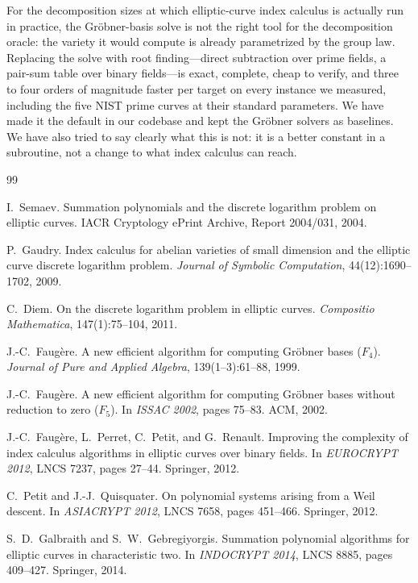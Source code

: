 \documentclass[10pt,a4paper]{article}
\theoremstyle{remark}
\begin{document}
For the decomposition sizes at which elliptic-curve index calculus is
actually run in practice, the Gr\"obner-basis solve is not the right
tool for the decomposition oracle: the variety it would compute is
already parametrized by the group law. Replacing the solve with root
finding---direct subtraction over prime fields, a pair-sum table over
binary fields---is exact, complete, cheap to verify, and three to four
orders of magnitude faster per target on every instance we measured,
including the five NIST prime curves at their standard parameters. We
have made it the default in our codebase and kept the Gr\"obner solvers
as baselines. We have also tried to say clearly what this is not: it is
a better constant in a subroutine, not a change to what index calculus
can reach.

\begin{thebibliography}{99}

I.~Semaev.
Summation polynomials and the discrete logarithm problem on elliptic curves.
IACR Cryptology ePrint Archive, Report 2004/031, 2004.

P.~Gaudry.
Index calculus for abelian varieties of small dimension and the elliptic curve discrete logarithm problem.
\emph{Journal of Symbolic Computation}, 44(12):1690--1702, 2009.

C.~Diem.
On the discrete logarithm problem in elliptic curves.
\emph{Compositio Mathematica}, 147(1):75--104, 2011.

J.-C.~Faug\`ere.
A new efficient algorithm for computing Gr\"obner bases ($F_4$).
\emph{Journal of Pure and Applied Algebra}, 139(1--3):61--88, 1999.

J.-C.~Faug\`ere.
A new efficient algorithm for computing Gr\"obner bases without reduction to zero ($F_5$).
In \emph{ISSAC 2002}, pages 75--83. ACM, 2002.

J.-C.~Faug\`ere, L.~Perret, C.~Petit, and G.~Renault.
Improving the complexity of index calculus algorithms in elliptic curves over binary fields.
In \emph{EUROCRYPT 2012}, LNCS 7237, pages 27--44. Springer, 2012.

C.~Petit and J.-J.~Quisquater.
On polynomial systems arising from a Weil descent.
In \emph{ASIACRYPT 2012}, LNCS 7658, pages 451--466. Springer, 2012.

S.~D.~Galbraith and S.~W.~Gebregiyorgis.
Summation polynomial algorithms for elliptic curves in characteristic two.
In \emph{INDOCRYPT 2014}, LNCS 8885, pages 409--427. Springer, 2014.


\end{thebibliography}
\end{document}
